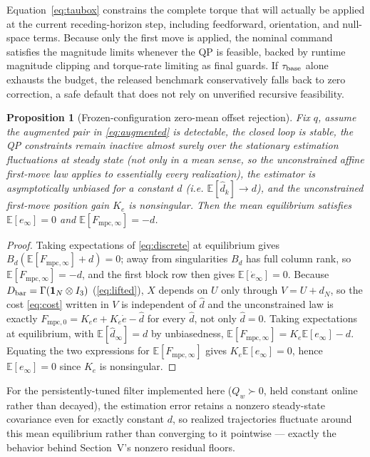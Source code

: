 \documentclass[conference]{IEEEtran}
\newtheorem{proposition}{Proposition}
\begin{document}
Equation~\eqref{eq:taubox} constrains the complete torque that will actually
be applied at the current receding-horizon step, including feedforward,
orientation, and null-space terms. Because only the first move is
applied, the nominal command satisfies the magnitude limits whenever the
QP is feasible, backed by runtime magnitude clipping and torque-rate
limiting as final guards. If $\tau_{\rm base}$ alone exhausts the budget,
the released benchmark conservatively falls back to zero correction, a
safe default that does not rely on unverified recursive feasibility.

\begin{proposition}[Frozen-configuration zero-mean offset rejection]
Fix $q$, assume the augmented pair in \eqref{eq:augmented} is detectable, the
closed loop is stable, the QP constraints remain inactive almost surely over
the stationary estimation fluctuations at steady state (not only in a mean
sense, so the unconstrained affine first-move law applies to essentially
every realization), the estimator is asymptotically unbiased for a constant
$d$ (i.e. $\mathbb E[\hat d_k]\to d$), and the unconstrained first-move
position gain $K_e$ is nonsingular. Then the mean equilibrium satisfies
$\mathbb E[e_\infty]=0$ and $\mathbb E[F_{\mathrm{mpc},\infty}]=-d$.
\end{proposition}
\begin{proof}
Taking expectations of \eqref{eq:discrete} at equilibrium gives
$B_d(\mathbb E[F_{\mathrm{mpc},\infty}]+d)=0$; away from singularities $B_d$
has full column rank, so $\mathbb E[F_{\mathrm{mpc},\infty}]=-d$, and the
first block row then gives $\mathbb E[\dot e_\infty]=0$. Because
$D_{\rm bar}=\Gamma(\bm 1_N\otimes I_3)$ (\eqref{eq:lifted}), $X$ depends on
$U$ only through $V=U+d_N$, so the cost \eqref{eq:cost} written in $V$ is
independent of $\hat d$ and the unconstrained law is exactly
$F_{\mathrm{mpc},0}=K_ee+K_{\dot e}\dot e-\hat d$ for every $\hat d$, not
only $\hat d=0$. Taking expectations at equilibrium, with
$\mathbb E[\hat d_\infty]=d$ by unbiasedness,
$\mathbb E[F_{\mathrm{mpc},\infty}]=K_e\mathbb E[e_\infty]-d$. Equating the
two expressions for $\mathbb E[F_{\mathrm{mpc},\infty}]$ gives
$K_e\mathbb E[e_\infty]=0$, hence $\mathbb E[e_\infty]=0$ since $K_e$ is
nonsingular.
\end{proof}
For the persistently-tuned filter implemented here ($Q_w\succ0$, held
constant online rather than decayed), the estimation error retains a
nonzero steady-state covariance even for exactly constant $d$, so realized
trajectories fluctuate around this mean equilibrium rather than converging
to it pointwise --- exactly the behavior behind Section~V's nonzero
residual floors.
\end{document}

